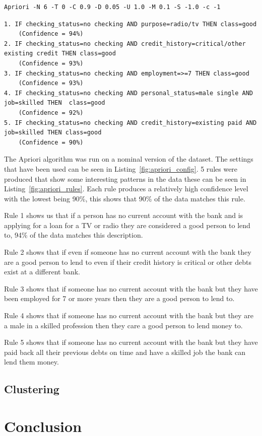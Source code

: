 \documentclass[12pt]{article}
\begin{document}
\begin{lstlisting}[caption="Apriori configuration"\label{fig:apriori_config}]
Apriori -N 6 -T 0 -C 0.9 -D 0.05 -U 1.0 -M 0.1 -S -1.0 -c -1
\end{lstlisting}
\begin{lstlisting}[caption="Apriori rules"\label{fig:apriori_rules}]
1. IF checking_status=no checking AND purpose=radio/tv THEN class=good 
    (Confidence = 94%)
2. IF checking_status=no checking AND credit_history=critical/other existing credit THEN class=good 
    (Confidence = 93%)
3. IF checking_status=no checking AND employment=>=7 THEN class=good 
    (Confidence = 93%)
4. IF checking_status=no checking AND personal_status=male single AND job=skilled THEN  class=good 
    (Confidence = 92%)
5. IF checking_status=no checking AND credit_history=existing paid AND job=skilled THEN class=good 
    (Confidence = 90%)

\end{lstlisting}
The Apriori algorithm was run on a nominal version of the dataset. The settings that have been used can be seen in Listing~\ref{fig:apriori_config}. 5 rules were produced that show some interesting patterns in the data these can be seen in Listing~\ref{fig:apriori_rules}. Each rule produces a relatively high confidence level with the lowest being 90\%, this shows that 90\% of the data matches this rule. 

Rule 1 shows us that if a person has no current account with the bank and is applying for a loan for a TV or radio they are considered a good person to lend to, 94\% of the data matches this description.

Rule 2 shows that if even if someone has no current account with the bank they are a good person to lend to even if their credit history is critical or other debts exist at a different bank.

Rule 3 shows that if someone has no current account with the bank but they have been employed for 7 or more years then they are a good person to lend to.

Rule 4 shows that if someone has no current account with the bank but they are a male in a skilled profession then they care a good person to lend money to.

Rule 5 shows that if someone has no current account with the bank but they have paid back all their previous debts on time and have a skilled job the bank can lend them money.

\subsection{Clustering}

\section{Conclusion}
\end{document}
